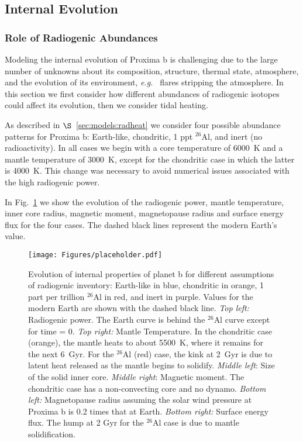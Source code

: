 \documentclass[preprint,12pt]{aastex}
\def\eg{{\it e.g.\ }}
\begin{document}
\subsection{Internal Evolution}
\label{sec:results:internal}

\subsubsection{Role of Radiogenic Abundances}

Modeling the internal evolution of Proxima b is challenging due to
 the large number of unknowns about its composition, 
structure, thermal state,
 atmosphere, and the evolution of its environment, \eg
flares stripping the atmosphere. In this section we first consider how
different abundances of radiogenic isotopes could affect its
evolution, then we consider tidal heating.

As described in $\S$~\ref{sec:models:radheat} we consider four
possible abundance patterns for Proxima b: Earth-like, chondritic, 1
ppt $^{26}$Al, and inert (no radioactivity). In all cases we begin with a core
temperature of 6000~K and a mantle temperature of 3000~K, except for
the chondritic case in which the latter is 4000~K. This change was
necessary 
to avoid numerical issues associated with the high
radiogenic power.

In Fig.~\ref{fig:notides} we show the evolution of the radiogenic
power, mantle temperature, inner core radius, magnetic moment,
magnetopause radius and surface energy flux for the four cases. The
dashed black lines represent the modern Earth's value.

\begin{figure} 
\begin{center}
\texttt{[image: Figures/placeholder.pdf]}
\end{center}
\caption{Evolution of internal properties of planet b for different
  assumptions of radiogenic inventory: Earth-like in blue, chondritic
  in orange, 1 part per trillion $^{26}$Al in red, and inert in
  purple. 
  Values for the modern Earth are shown with the dashed black
  line. {\it Top left:} Radiogenic power. The Earth curve is behind
  the $^{26}$Al curve except for time = 0. {\it Top right:} Mantle
  Temperature. In the chondritic case (orange), the mantle heats to
  about 5500~K, where it remains for the next 6~Gyr. For the $^{26}$Al
  (red) case, the kink at 2~Gyr is due to latent heat released as the
  mantle begins to solidify. {\it Middle left}: Size of the solid
  inner core. {\it Middle right}: Magnetic moment. The chondritic case
  has a non-convecting core and no dynamo. {\it Bottom
    left:} Magnetopause radius assuming the solar wind pressure at Proxima b is
  0.2 times that at Earth. {\it Bottom right:} Surface energy
  flux. The hump at 2 Gyr for the $^{26}$Al case is due to mantle
  solidification.}
\label{fig:notides}
\end{figure}
\end{document}

